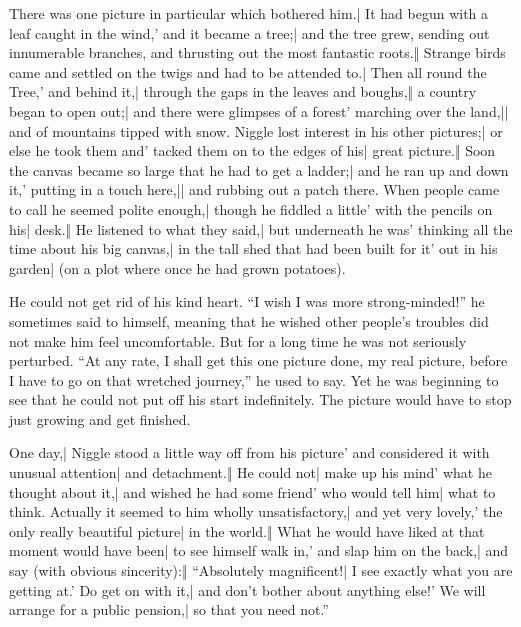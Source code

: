 \begin{itemize}
\halfone There was one picture in particular which bothered him.| It had begun with a leaf caught in the wind,' and it became a tree;| and the tree grew, sending out innumerable branches, and thrusting out the most fantastic roots.‖
\halftwo Strange birds came and settled on the twigs and had to be attended to.| Then all round the Tree,' and behind it,| through the gaps in the leaves and boughs,‖ a country began to open out;| and there were glimpses of a forest' marching over the land,|| and of mountains tipped with snow.
\halfone Niggle lost interest in his other pictures;| or else he took them and' tacked them on to the edges of his| great picture.‖ Soon the canvas became so large that he had to get a ladder;| and he ran up and down it,' putting in a touch here,|| and rubbing out a patch there.
\halftwo When people came to call he seemed polite enough,| though he fiddled a little' with the pencils on his| desk.‖ He listened to what they said,| but underneath he was' thinking all the time about his big canvas,| in the tall shed that had been built for it' out in his garden| (on a plot where once he had grown potatoes).
\end{itemize}

He could not get rid of his kind heart. “I wish I was more strong-minded!” he sometimes said to himself, meaning that he wished other people’s troubles did not make him feel uncomfortable. But for a long time he was not seriously perturbed. “At any rate, I shall get this one picture done, my real picture, before I have to go on that wretched journey,” he used to say. Yet he was beginning to see that he could not put off his start indefinitely. The picture would have to stop just growing and get finished.


\onlyscore{\enlargethispage{4\baselineskip}}%
\begin{itemize}
\halfone One day,| Niggle stood a little way off from his picture' and considered it with unusual attention| and detachment.‖ He could not| make up his mind' what he thought about it,| and wished he had some friend' who would tell him| what to think.
\halftwo Actually it seemed to him wholly unsatisfactory,| and yet very lovely,' the only really beautiful picture| in the world.‖
\halfone What he would have liked at that moment would have been| to see himself walk in,' and slap him on the back,| and say (with obvious sincerity):‖ “Absolutely magnificent!| I see exactly what you are getting at.' Do get on with it,| and don’t bother about anything else!' We will arrange for a public pension,| so that you need not.”
\end{itemize}

